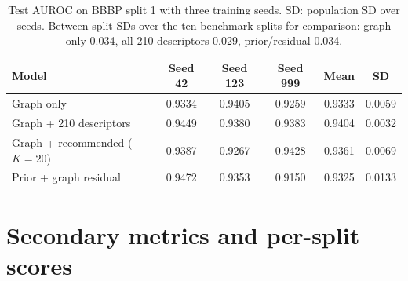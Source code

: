 \documentclass[10pt,a4paper]{article}
\renewcommand{\thetable}{S\arabic{table}}
\begin{document}
\begin{table}[H]
\renewcommand{\thetable}{S12}
\caption{Test AUROC on BBBP split 1 with three training seeds. SD: population SD over seeds. Between-split SDs over the ten benchmark splits for comparison: graph only 0.034, all 210 descriptors 0.029, prior/residual 0.034.}\label{tab:seed}
\centering\footnotesize
\begin{tabular}{@{}lccccc@{}}
\toprule
Model & Seed 42 & Seed 123 & Seed 999 & Mean & SD \\
\midrule
Graph only & 0.9334 & 0.9405 & 0.9259 & 0.9333 & 0.0059 \\
Graph + 210 descriptors & 0.9449 & 0.9380 & 0.9383 & 0.9404 & 0.0032 \\
Graph + recommended ($K=20$) & 0.9387 & 0.9267 & 0.9428 & 0.9361 & 0.0069 \\
Prior + graph residual & 0.9472 & 0.9353 & 0.9150 & 0.9325 & 0.0133 \\
\bottomrule
\end{tabular}
\end{table}

\section*{Secondary metrics and per-split scores}
\end{document}
